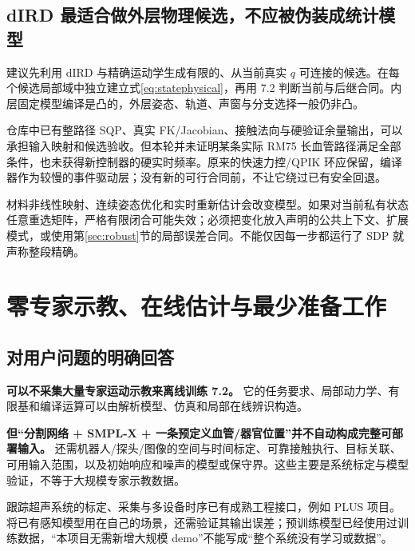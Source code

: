 \documentclass[UTF8,fontset=fandol,11pt,a4paper]{ctexart}
\theoremstyle{definition}\newtheorem{definition}[theorem]{定义}\newtheorem{assumption}[theorem]{条件}
\numberwithin{equation}{section}
\begin{document}
\subsection{dIRD 最适合做外层物理候选，不应被伪装成统计模型}
建议先利用 dIRD 与精确运动学生成有限的、从当前真实 $q$ 可连接的候选。在每个候选局部域中独立建立式\eqref{eq:statephysical}，再用 7.2 判断当前与后继合同。内层固定模型编译是凸的，外层姿态、轨道、声窗与分支选择一般仍非凸。

仓库中已有整路径 SQP、真实 FK/Jacobian、接触法向与硬验证余量输出\cite{realus}，可以承担输入映射和候选验收。但本轮并未证明某条实际 RM75 长血管路径满足全部条件，也未获得新控制器的硬实时频率。原来的快速力控/QPIK 环应保留，编译器作为较慢的事件驱动层；没有新的可行合同前，不让它绕过已有安全回退。

材料非线性映射、连续姿态优化和实时重新估计会改变模型。如果对当前私有状态任意重选矩阵，严格有限闭合可能失效；必须把变化放入声明的公共上下文、扩展模式，或使用第\ref{sec:robust}节的局部误差合同。不能仅因每一步都运行了 SDP 就声称整段精确。

\section{零专家示教、在线估计与最少准备工作}
\label{sec:data}
\subsection{对用户问题的明确回答}
\begin{keybox}
\textbf{可以不采集大量专家运动示教来离线训练 7.2。}
它的任务要求、局部动力学、有限基和编译运算可以由解析模型、仿真和局部在线辨识构造。

\textbf{但“分割网络 + SMPL-X + 一条预定义血管/器官位置”并不自动构成完整可部署输入。}
还需机器人/探头/图像的空间与时间标定、可靠接触执行、目标关联、可用输入范围，以及初始响应和噪声的模型或保守界。这些主要是系统标定与模型验证，不等于大规模专家示教数据。
\end{keybox}

跟踪超声系统的标定、采集与多设备时序已有成熟工程接口，例如 PLUS 项目\cite{plus}。将已有感知模型用在自己的场景，还需验证其输出误差；预训练模型已经使用过训练数据，“本项目无需新增大规模 demo”不能写成“整个系统没有学习或数据”。
\end{document}
